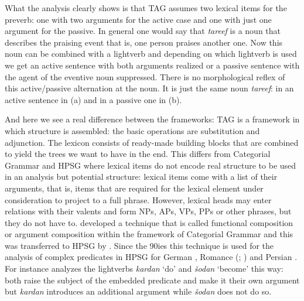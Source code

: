 What the analysis clearly shows is that TAG assumes two lexical items for the preverb: one with two
arguments for the active case and one with just one argument\pagebreak{}
for the passive. In general one would
say that \emph{tareef} is a noun that describes the praising event that is, one 
person praises another one. Now this noun can be combined with a lightverb and depending on which
lightverb is used we get an active sentence with both arguments realized or a passive sentence with
the agent of the eventive noun suppressed. There is no morphological reflex of this active/passive
alternation at the noun. It is just the same noun \emph{tareef}: in an active sentence in (a)
and in a passive one in (b).

\largerpage
And here we see a real difference between the frameworks: TAG is a framework in which structure is
assembled: the basic operations are substitution and adjunction. The lexicon consists of ready-made
building blocks that are combined to yield the trees we want to have in the end. This differs from
Categorial Grammar %
and HPSG %
where lexical items do not
encode real structure to be used in an analysis but potential structure: lexical items come with a
list of their arguments, that is, items that are required for the lexical element under
consideration to project to a full phrase. However, lexical heads may enter
relations with their valents and form NPs, APs, VPs, PPs or other phrases, but they do not have
to. \citet{Geach70a} developed a technique that is called functional composition or argument
composition within the framework of Categorial Grammar and this was transferred to HPSG by
\citet{HN89a,HN94a}. Since the 90ies this technique is used for the analysis of complex predicates
in HPSG for German \citep{HN89a,HN94a,Kiss95a,Meurers99a,Mueller99a,Kathol2000a},
Romance (\citealp[]{MS97a-u}; \citealp{Monachesi98a}) and Persian \citep{MuellerPersian}. For instance \citet[]{MuellerPersian} analyzes the lightverbs \emph{kardan} `do' and \emph{šodan} `become' this
way: both raise the subject of the embedded predicate and make it their own argument but
\emph{kardan} introduces an additional argument while \emph{šodan} does not do so.

